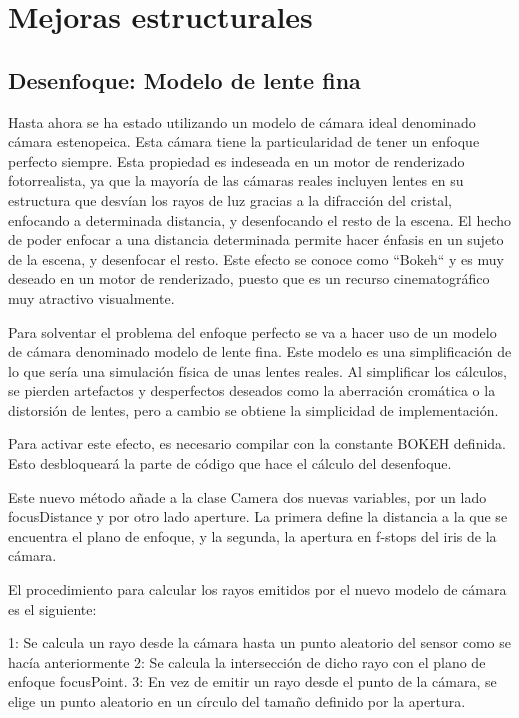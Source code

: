 \chapter{Mejoras estructurales}
	
	\section{Desenfoque: Modelo de lente fina}
	
	Hasta ahora se ha estado utilizando un modelo de cámara ideal denominado cámara estenopeica. Esta cámara tiene la particularidad de tener un enfoque perfecto siempre. Esta propiedad es indeseada en un motor de renderizado fotorrealista, ya que la mayoría de las cámaras reales incluyen lentes en su estructura que desvían los rayos de luz gracias a la difracción del cristal, enfocando a determinada distancia, y desenfocando el resto de la escena. El hecho de poder enfocar a una distancia determinada permite hacer énfasis en un sujeto de la escena, y desenfocar el resto. Este efecto se conoce como ``Bokeh`` y es muy deseado en un motor de renderizado, puesto que es un recurso cinematográfico muy atractivo visualmente.

	Para solventar el problema del enfoque perfecto se va a hacer uso de un modelo de cámara denominado modelo de lente fina. Este modelo es una simplificación de lo que sería una simulación física de unas lentes reales. Al simplificar los cálculos, se pierden artefactos y desperfectos deseados como la aberración cromática o la distorsión de lentes, pero a cambio se obtiene la simplicidad de implementación.

	Para activar este efecto, es necesario compilar con la constante BOKEH definida. Esto desbloqueará la parte de código que hace el cálculo del desenfoque. 
	
	Este nuevo método añade a la clase Camera dos nuevas variables, por un lado focusDistance y por otro lado aperture. La primera define la distancia a la que se encuentra el plano de enfoque, y la segunda, la apertura en f-stops del iris de la cámara. 

	El procedimiento para calcular los rayos emitidos por el nuevo modelo de cámara es el siguiente:

	1: Se calcula un rayo desde la cámara hasta un punto aleatorio del sensor como se hacía anteriormente
	2: Se calcula la intersección de dicho rayo con el plano de enfoque focusPoint.
	3: En vez de emitir un rayo desde el punto de la cámara, se elige un punto aleatorio en un círculo del tamaño definido por la apertura.

